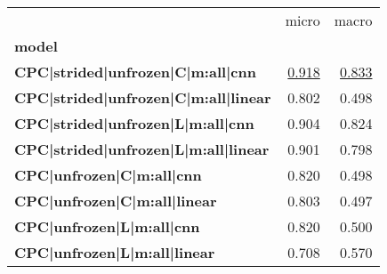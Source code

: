 \begin{adjustbox}{width=\textwidth}
\begin{tabular}{lrr}
\toprule
{} &  micro &  macro \\
\textbf{model                                             } &        &        \\
\midrule
\textbf{CPC|strided|unfrozen|C|m:all|cnn   } &  \underline{0.918} &  \underline{0.833} \\
\textbf{CPC|strided|unfrozen|C|m:all|linear} &  0.802 &  0.498 \\
\textbf{CPC|strided|unfrozen|L|m:all|cnn   } &  0.904 &  0.824 \\
\textbf{CPC|strided|unfrozen|L|m:all|linear} &  0.901 &  0.798 \\
\textbf{CPC|unfrozen|C|m:all|cnn           } &  0.820 &  0.498 \\
\textbf{CPC|unfrozen|C|m:all|linear        } &  0.803 &  0.497 \\
\textbf{CPC|unfrozen|L|m:all|cnn           } &  0.820 &  0.500 \\
\textbf{CPC|unfrozen|L|m:all|linear        } &  0.708 &  0.570 \\
\bottomrule
\end{tabular}
\end{adjustbox}